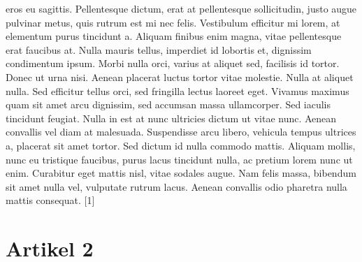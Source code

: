 \documentclass[
  ngerman,
  14pt,
  a4paper,
  DIV=11,
  twoside]{scrreprt}
\begin{document}
eros eu sagittis. Pellentesque dictum, erat at pellentesque
sollicitudin, justo augue pulvinar metus, quis rutrum est mi nec felis.
Vestibulum efficitur mi lorem, at elementum purus tincidunt a. Aliquam
finibus enim magna, vitae pellentesque erat faucibus at. Nulla mauris
tellus, imperdiet id lobortis et, dignissim condimentum ipsum. Morbi
nulla orci, varius at aliquet sed, facilisis id tortor. Donec ut urna
nisi. Aenean placerat luctus tortor vitae molestie. Nulla at aliquet
nulla. Sed efficitur tellus orci, sed fringilla lectus laoreet eget.
Vivamus maximus quam sit amet arcu dignissim, sed accumsan massa
ullamcorper. Sed iaculis tincidunt feugiat. Nulla in est at nunc
ultricies dictum ut vitae nunc. Aenean convallis vel diam at malesuada.
Suspendisse arcu libero, vehicula tempus ultrices a, placerat sit amet
tortor. Sed dictum id nulla commodo mattis. Aliquam mollis, nunc eu
tristique faucibus, purus lacus tincidunt nulla, ac pretium lorem nunc
ut enim. Curabitur eget mattis nisl, vitae sodales augue. Nam felis
massa, bibendum sit amet nulla vel, vulputate rutrum lacus. Aenean
convallis odio pharetra nulla mattis consequat. {[}1{]}

\section{Artikel 2}\label{artikel-2}
\end{document}
